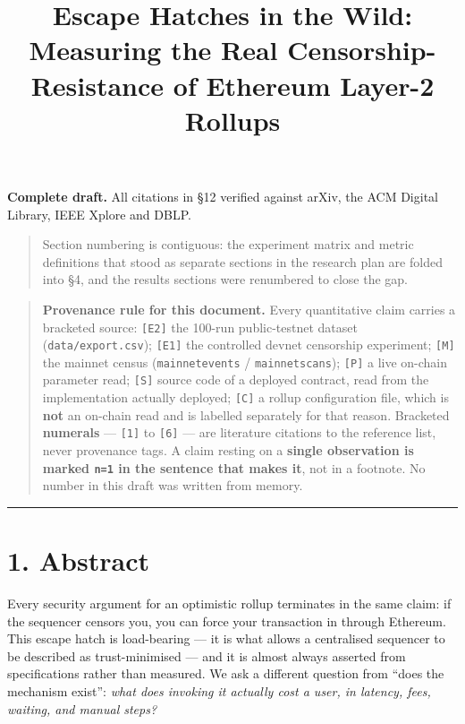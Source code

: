 \documentclass[conference]{IEEEtran}
\renewcommand{\_}{\textunderscore\allowbreak}
\begin{document}
\title{Escape Hatches in the Wild: Measuring the Real Censorship-Resistance of Ethereum Layer-2 Rollups}
\author{
}
\maketitle
\textbf{Complete draft.} All citations in §12 verified against arXiv,
the ACM Digital Library, IEEE Xplore and DBLP.

\begin{quote}
Section numbering is contiguous: the experiment matrix and metric
definitions that stood as separate sections in the research plan are
folded into §4, and the results sections were renumbered to close the
gap.
\end{quote}

\begin{quote}
\textbf{Provenance rule for this document.} Every quantitative claim
carries a bracketed source: \texttt{{[}E2{]}} the 100-run public-testnet
dataset (\texttt{data/export.csv}); \texttt{{[}E1{]}} the controlled
devnet censorship experiment; \texttt{{[}M{]}} the mainnet census
(\texttt{mainnet\_events} / \texttt{mainnet\_scans}); \texttt{{[}P{]}} a
live on-chain parameter read; \texttt{{[}S{]}} source code of a deployed
contract, read from the implementation actually deployed;
\texttt{{[}C{]}} a rollup configuration file, which is \textbf{not} an
on-chain read and is labelled separately for that reason. Bracketed
\textbf{numerals} --- \texttt{{[}1{]}} to \texttt{{[}6{]}} --- are
literature citations to the reference list, never provenance tags. A
claim resting on a \textbf{single observation is marked \texttt{n=1} in
the sentence that makes it}, not in a footnote. No number in this draft
was written from memory.
\end{quote}

\begin{center}\rule{0.5\linewidth}{0.5pt}\end{center}

\section{1. Abstract}\label{abstract}

Every security argument for an optimistic rollup terminates in the same
claim: if the sequencer censors you, you can force your transaction in
through Ethereum. This escape hatch is load-bearing --- it is what
allows a centralised sequencer to be described as trust-minimised ---
and it is almost always asserted from specifications rather than
measured. We ask a different question from ``does the mechanism exist'':
\emph{what does invoking it actually cost a user, in latency, fees,
waiting, and manual steps?}
\end{document}
